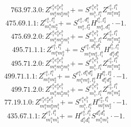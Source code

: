\documentclass[letterpaper,10pt,fleqn,leqno,onecolumn]{article}
\begin{document}
\begin{equation} \;\;\;\;\;\;  763.97.3.0: Z^{e_{1}^{a}e_{2}^{a}e_{1}^{b}}_{m_{1}^{a}m_{2}^{a}m_{1}^{b}}+=S^{e_{1}^{a}e_{1}^{b}}_{m_{1}^{b},l_{1}^{a}}Z^{e_{2}^{a},l_{1}^{a}}_{m_{1}^{a}m_{2}^{a}} \end{equation}
\begin{equation} \;\;\;\;\;\;  475.69.1.1: Z^{e_{1}^{a},l_{1}^{a}}_{m_{1}^{a}m_{2}^{a}}+=S^{e_{1}^{a},d_{1}^{a}}_{m_{1}^{a},l_{2}^{a}}H^{l_{1}^{a},l_{2}^{a}}_{m_{2}^{a},d_{1}^{a}}\cdot -1. \end{equation}
\begin{equation} \;\;\;\;\;\;  475.69.2.0: Z^{e_{1}^{a}e_{2}^{a}e_{1}^{b}}_{m_{1}^{a}m_{2}^{a}m_{1}^{b}}+=S^{e_{1}^{a}e_{1}^{b}}_{m_{1}^{b},l_{1}^{a}}Z^{e_{2}^{a},l_{1}^{a}}_{m_{1}^{a}m_{2}^{a}} \end{equation}
\begin{equation} \;\;\;\;\;\;  495.71.1.1: Z^{e_{1}^{a},l_{1}^{a}}_{m_{1}^{a}m_{2}^{a}}+=S^{e_{1}^{a},d_{1}^{a}d_{1}^{b}}_{m_{1}^{a}m_{2}^{a},l_{1}^{b}}H^{l_{1}^{b},l_{1}^{a}}_{d_{1}^{a}d_{1}^{b}} \end{equation}
\begin{equation} \;\;\;\;\;\;  495.71.2.0: Z^{e_{1}^{a}e_{2}^{a}e_{1}^{b}}_{m_{1}^{a}m_{2}^{a}m_{1}^{b}}+=S^{e_{1}^{a}e_{1}^{b}}_{m_{1}^{b},l_{1}^{a}}Z^{e_{2}^{a},l_{1}^{a}}_{m_{1}^{a}m_{2}^{a}} \end{equation}
\begin{equation} \;\;\;\;\;\;  499.71.1.1: Z^{e_{1}^{a},l_{1}^{a}}_{m_{1}^{a}m_{2}^{a}}+=S^{e_{1}^{a},d_{1}^{a}d_{2}^{a}}_{m_{1}^{a}m_{2}^{a},l_{2}^{a}}H^{l_{1}^{a},l_{2}^{a}}_{d_{1}^{a}d_{2}^{a}}\cdot -1. \end{equation}
\begin{equation} \;\;\;\;\;\;  499.71.2.0: Z^{e_{1}^{a}e_{2}^{a}e_{1}^{b}}_{m_{1}^{a}m_{2}^{a}m_{1}^{b}}+=S^{e_{1}^{a}e_{1}^{b}}_{m_{1}^{b},l_{1}^{a}}Z^{e_{2}^{a},l_{1}^{a}}_{m_{1}^{a}m_{2}^{a}} \end{equation}
\begin{equation} \;\;\;\;\;\;  77.19.1.0: Z^{e_{1}^{a}e_{2}^{a}e_{1}^{b}}_{m_{1}^{a}m_{2}^{a}m_{1}^{b}}+=S^{e_{1}^{a}e_{1}^{b}}_{m_{1}^{b},l_{1}^{a}}H^{e_{2}^{a},l_{1}^{a}}_{m_{1}^{a}m_{2}^{a}}\cdot -1. \end{equation}
\begin{equation} \;\;\;\;\;\;  435.67.1.1: Z^{e_{1}^{a},l_{1}^{b}}_{m_{1}^{a}m_{1}^{b}}+=H^{e_{1}^{a},l_{1}^{b}}_{d_{1}^{a}d_{1}^{b}}S^{d_{1}^{a}d_{1}^{b}}_{m_{1}^{a}m_{1}^{b}}\cdot -1. \end{equation}
\end{document}
